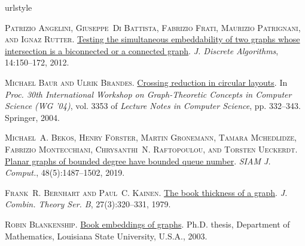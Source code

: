 \documentclass[kpfonts]{patmorin}
\begin{document}
\begin{thebibliography}{44}
	\providecommand{\natexlab}[1]{#1}
	\providecommand{\msn}[1]{MR:\,\href{http://www.ams.org/mathscinet-getitem?mr=MR{#1}}{#1}}
	\providecommand{\ZBL}[1]{Zbl:\,\href{https://www.zentralblatt-math.org/zmath/en/search/?q=an:#1}{#1}}
	\providecommand{\url}[1]{\texttt{#1}}
	\providecommand{\urlprefix}{}
	\expandafter\ifx\csname urlstyle\endcsname\relax
	\providecommand{\doi}[1]{doi:\discretionary{}{}{}#1}\else
	\providecommand{\doi}{doi:\discretionary{}{}{}\begingroup
		\urlstyle{rm}\Url}\fi

	\textsc{Patrizio Angelini, Giuseppe~Di Battista, Fabrizio Frati, Maurizio
		Patrignani, and Ignaz Rutter}.
	\newblock \href{https://doi.org/10.1016/j.jda.2011.12.015}{Testing the
		simultaneous embeddability of two graphs whose intersection is a biconnected
		or a connected graph}.
	\newblock \emph{J. Discrete Algorithms}, 14:150--172, 2012.

	\textsc{Michael Baur and Ulrik Brandes}.
	\newblock \href{https://doi.org/10.1007/978-3-540-30559-0\_28}{Crossing
		reduction in circular layouts}.
	\newblock In \emph{Proc. 30th International Workshop on Graph-Theoretic
		Concepts in Computer Science (WG '04)}, vol. 3353 of \emph{Lecture Notes in
		Computer Science}, pp. 332--343. Springer, 2004.

	\textsc{Michael~A. Bekos, Henry F{\"{o}}rster, Martin Gronemann, Tamara
		Mchedlidze, Fabrizio Montecchiani, Chrysanthi~N. Raftopoulou, and Torsten
		Ueckerdt}.
	\newblock \href{https://doi.org/10.1137/19M125340X}{Planar graphs of bounded
		degree have bounded queue number}.
	\newblock \emph{SIAM J. Comput.}, 48(5):1487--1502, 2019.

	\textsc{Frank~R. Bernhart and Paul~C. Kainen}.
	\newblock \href{https://doi.org/10.1016/0095-8956(79)90021-2}{The book
		thickness of a graph}.
	\newblock \emph{J. Combin. Theory Ser. B}, 27(3):320--331, 1979.

	\textsc{Robin Blankenship}.
	\newblock
	\href{http://etd.lsu.edu/docs/available/etd-0709103-163907/unrestricted/Blankenship_dis.pdf}{Book
		embeddings of graphs}.
	\newblock Ph.D. thesis, Department of Mathematics, Louisiana State University,
	U.S.A., 2003.


\end{thebibliography}
\end{document}
